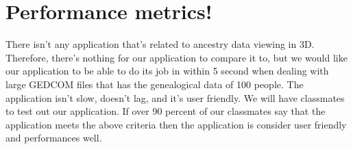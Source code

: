 \documentclass[onecolumn, draftclsnofoot, 10pt, compsoc]{IEEEtran}
\begin{document}
\section{Performance metrics!}
\begin{singlespace}
There isn't any application that's related to ancestry data viewing in 3D. Therefore, there's nothing for our application to compare it to, but we would like our application to be able to do its job in within 5 second when dealing with large GEDCOM files that has the genealogical data of 100 people. The application isn't slow, doesn't lag, and it's user friendly. We will have classmates to test out our application. If over 90 percent of our classmates say that the application meets the above criteria then the application is consider user friendly and performances well. 
\end{singlespace}
\end{document}
